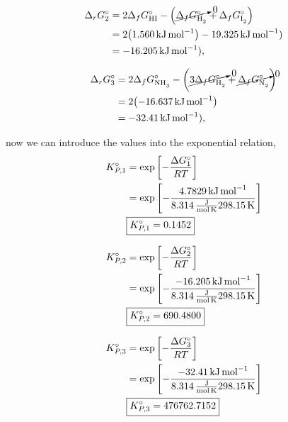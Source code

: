 \documentclass[main.tex]{subfiles}
\begin{document}
\begin{align*}
    \Delta_r G^\circ_2 &= 2\Delta_f G^\circ_{\ce{HI}} - \qty(\cancelto{0}{\Delta_f G^\circ_{\ce{H2}}} + \Delta_f G^\circ_{\ce{I2}}) \\
    &= 2\qty(\SI{1.560}{\kilo\joule\per\mol}) - \SI{19.325}{\kilo\joule\per\mol}) \\
    &= -\SI{16.205}{\kilo\joule\per\mol}),
\end{align*}

\begin{align*}
    \Delta_r G^\circ_3 &= 2\Delta_f G^\circ_{\ce{NH3}} - \qty(\cancelto{0}{3\Delta_f G^\circ_{\ce{H2}}} + \cancelto{0}{\Delta_f G^\circ_{\ce{N2}}}) \\
    &= 2\qty(-\SI{16.637}{\kilo\joule\per\mol}) \\
    &= -\SI{32.41}{\kilo\joule\per\mol}),
\end{align*}

now we can introduce the values into the exponential relation,
\begin{align*}
    K^\circ_{P,1} &= \exp\qty[-\frac{\Delta G^\circ_{1}}{RT}] \\
    &= \exp\qty[-\frac{\SI{4.7829}{\kilo\joule\per\mol}}{\SI[per-mode=fraction]{8.314}{\joule\per\mole\per\kelvin}\SI{298.15}{\kelvin}}] \\
    &\boxed{K^\circ_{P,1} =0.1452}
\end{align*}

\begin{align*}
    K^\circ_{P,2} &= \exp\qty[-\frac{\Delta G^\circ_{2}}{RT}] \\
    &= \exp\qty[-\frac{-\SI{16.205}{\kilo\joule\per\mol}}{\SI[per-mode=fraction]{8.314}{\joule\per\mole\per\kelvin}\SI{298.15}{\kelvin}}] \\
    &\boxed{K^\circ_{P,2} =690.4800}
\end{align*}

\begin{align*}
    K^\circ_{P,3} &= \exp\qty[-\frac{\Delta G^\circ_{3}}{RT}] \\
    &= \exp\qty[-\frac{-\SI{32.41}{\kilo\joule\per\mol}}{\SI[per-mode=fraction]{8.314}{\joule\per\mole\per\kelvin}\SI{298.15}{\kelvin}}] \\
    &\boxed{K^\circ_{P,3} =476762.7152}
\end{align*}
\end{document}
